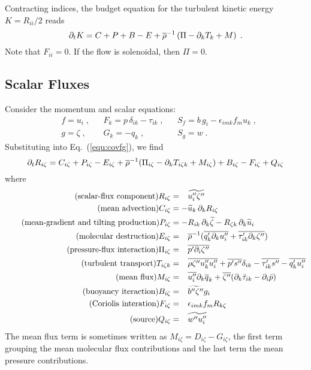 Contracting indices, the budget equation for the turbulent kinetic energy $K=R_{ii}/2$ reads
\begin{equation}
    \pt{K}{t} = C +P +B -E +\avr{\rho}^{-1} \left( \Pi -\pt{T_k}{k} +M \right)\;.
\end{equation}
Note that $F_{ii}=0$. If the flow is solenoidal, then $\Pi=0$.

\subsection{Scalar Fluxes}

Consider the momentum and scalar equations:
\begin{align}
    &f = u_i\;,   && F_k =p\,\delta_{ik}-\tau_{ik}\;,  && S_f = b\, g_i- \epsilon_{imk} f_m u_k\;,\\
    &g = \zeta\;, && G_k =-q_{k}\;,                    && S_g = w\;.
\end{align}
Substituting into Eq.~(\ref{equ:covfg}), we find 
\begin{equation}\label{equ:Ris}
    \pt{R_{i \zeta}}{t}= C_{i\zeta} +P_{i\zeta} -E_{i\zeta}
    +\avr{\rho}^{-1} ( \Pi_{i\zeta} -\pt{T_{i\zeta k}}{k} +M_{i\zeta} ) +B_{i\zeta} -F_{i\zeta} +Q_{i\zeta}
\end{equation}
where
\begin{align}
    \tag{scalar-flux component}
    R_{i\zeta}    &=\phantom{-} \avf{u_i''\zeta''} \\
    \tag{mean advection}
    C_{i\zeta}    &=-\avf{u}_k\,\pt{R_{i\zeta}}{k} \\
    \tag{mean-gradient and tilting production}
    P_{i\zeta}    &=-R_{ik}\,\pt{\avf{\zeta}}{k} -R_{\zeta k}\,\pt{\avf{u}_i}{k} \\
    \tag{molecular destruction}
    E_{i\zeta} &=\phantom{-} \avr{\rho}^{-1} ( \avr{q_k'\pt{u_i''}{k}}
    +\avr{\tau_{ik}' \pt{\zeta''}{k}} ) \\
    \tag{pressure-flux interaction}
    \Pi_{i\zeta}  &=\phantom{-} \avr{p'\pt{\zeta''}{i}}\\
    \tag{\text{turbulent transport}}
    T_{i\zeta k}  &=\phantom{-} \avr{\rho \zeta''u''_ku''_i } +\avr{p's''}\delta_{ik}
    -\avr{\tau'_{ik}s''}-\avr{q_k'u_i''}\\
    \tag{mean flux}
    M_{i\zeta}    &=\phantom{-} \avr{u''_i}\pt{\avr{q}_k}{k}
    +\avr{\zeta''} ( \pt{\bar{\tau}_{ik}}{k} -\pt{\bar{p}}{i} ) \\
    \tag{buoyancy iteraction}
    B_{i\zeta}    &=\phantom{-} \avf{b''\zeta''}g_i \\
    \tag{Coriolis interation}
    F_{i\zeta}    &=\phantom{-} \epsilon_{imk} f_m R_{k\zeta} \\
    \tag{source}
    Q_{i\zeta}    &=\phantom{-} \avf{w''u_i''}
\end{align}
The mean flux term is sometimes written as $M_{i\zeta}=D_{i\zeta}-G_{i\zeta}$, the first term grouping the mean molecular flux contributions and the last term the mean pressure contributions.

